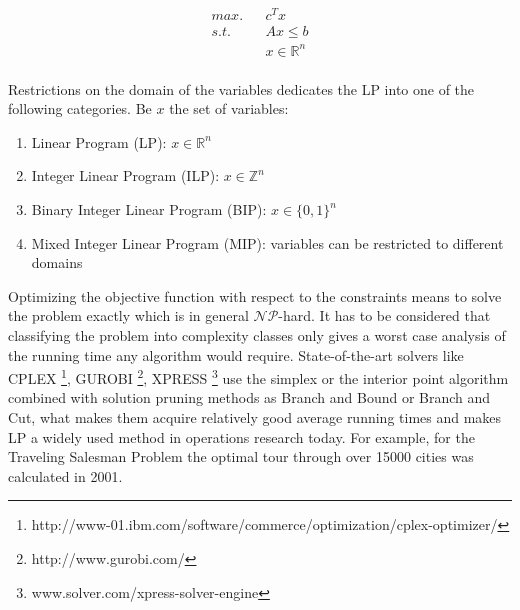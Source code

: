 \begin{equation*}
\begin{aligned}
max. && c^Tx            \\
s.t. && Ax \leq b       \\
&& x \in \mathbb{R}^n \\
\end{aligned}
\end{equation*}

%

Restrictions on the domain of the variables dedicates the LP into one of the following categories. Be $x$ the set of variables:
\begin{enumerate}
\item Linear Program (LP): $x \in \mathbb{R}^n$
\item Integer Linear Program (ILP): $x \in \mathbb{Z}^n$
\item Binary Integer Linear Program (BIP): $x \in \{0,1\}^n$
\item Mixed Integer Linear Program (MIP): variables can be restricted to different domains
\end{enumerate}

Optimizing the objective function with respect to the constraints means to solve the problem exactly which is in general $\mathcal{NP}$-hard. It has to be considered that classifying the problem into complexity classes only gives a worst case analysis of the running time any algorithm would require. State-of-the-art solvers like CPLEX \footnote{http://www-01.ibm.com/software/commerce/optimization/cplex-optimizer/}, GUROBI \footnote{http://www.gurobi.com/}, XPRESS \footnote{www.solver.com/xpress-solver-engine} use the simplex or the interior point algorithm combined with solution pruning methods as Branch and Bound or Branch and Cut, what makes them acquire relatively good average running times and makes LP a widely used method in operations research today. For example, for the Traveling Salesman Problem the optimal tour through over 15000 cities was calculated in 2001.
